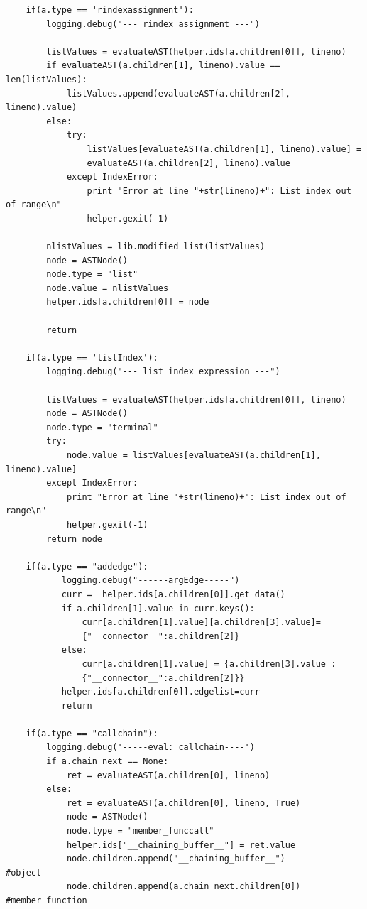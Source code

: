 \documentclass[a4paper]{article}
\begin{document}
\begin{verbatim}
    if(a.type == 'rindexassignment'):
        logging.debug("--- rindex assignment ---")

        listValues = evaluateAST(helper.ids[a.children[0]], lineno)
        if evaluateAST(a.children[1], lineno).value == len(listValues):
            listValues.append(evaluateAST(a.children[2], lineno).value)
        else:
            try:
                listValues[evaluateAST(a.children[1], lineno).value] = 
                evaluateAST(a.children[2], lineno).value
            except IndexError:
                print "Error at line "+str(lineno)+": List index out of range\n"
                helper.gexit(-1)
        
        nlistValues = lib.modified_list(listValues)
        node = ASTNode()
        node.type = "list"
        node.value = nlistValues
        helper.ids[a.children[0]] = node

        return

    if(a.type == 'listIndex'):
        logging.debug("--- list index expression ---")

        listValues = evaluateAST(helper.ids[a.children[0]], lineno)
        node = ASTNode()
        node.type = "terminal"
        try:
            node.value = listValues[evaluateAST(a.children[1], lineno).value]
        except IndexError:
            print "Error at line "+str(lineno)+": List index out of range\n"
            helper.gexit(-1)
        return node

    if(a.type == "addedge"):
           logging.debug("------argEdge-----")
           curr =  helper.ids[a.children[0]].get_data()
           if a.children[1].value in curr.keys():
               curr[a.children[1].value][a.children[3].value]=
               {"__connector__":a.children[2]}
           else:
               curr[a.children[1].value] = {a.children[3].value : 
               {"__connector__":a.children[2]}}
           helper.ids[a.children[0]].edgelist=curr
           return

    if(a.type == "callchain"):
        logging.debug('-----eval: callchain----')
        if a.chain_next == None:
            ret = evaluateAST(a.children[0], lineno)
        else:
            ret = evaluateAST(a.children[0], lineno, True)
            node = ASTNode()
            node.type = "member_funccall"
            helper.ids["__chaining_buffer__"] = ret.value
            node.children.append("__chaining_buffer__")                #object
            node.children.append(a.chain_next.children[0])      #member function
            

\end{verbatim}
\end{document}
